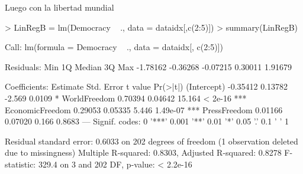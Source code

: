 \documentclass{article}
\begin{document}
Luego con la libertad mundial

\begin{Schunk}
\begin{Sinput}
> LinRegB = lm(Democracy ~ ., data = dataidx[,c(2:5)])
> summary(LinRegB)
\end{Sinput}
\begin{Soutput}
Call:
lm(formula = Democracy ~ ., data = dataidx[, c(2:5)])

Residuals:
     Min       1Q   Median       3Q      Max 
-1.78162 -0.36268 -0.07215  0.30011  1.91679 

Coefficients:
                Estimate Std. Error t value Pr(>|t|)    
(Intercept)     -0.35412    0.13782  -2.569   0.0109 *  
WorldFreedom     0.70394    0.04642  15.164  < 2e-16 ***
EconomicFreedom  0.29053    0.05335   5.446 1.49e-07 ***
PressFreedom     0.01166    0.07020   0.166   0.8683    
---
Signif. codes:  0 '***' 0.001 '**' 0.01 '*' 0.05 '.' 0.1 ' ' 1

Residual standard error: 0.6033 on 202 degrees of freedom
  (1 observation deleted due to missingness)
Multiple R-squared:  0.8303,	Adjusted R-squared:  0.8278 
F-statistic: 329.4 on 3 and 202 DF,  p-value: < 2.2e-16
\end{Soutput}
\end{Schunk}
\end{document}
